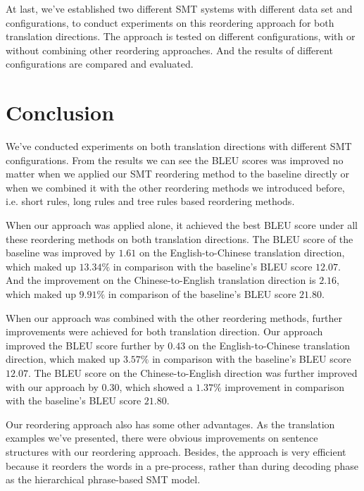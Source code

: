 At last, we've established two different \ac{SMT} systems with different data set and configurations, to conduct experiments on this reordering approach for both translation directions. The approach is tested on different configurations, with or without combining other reordering approaches. And the results of different configurations are compared and evaluated.

\section{Conclusion}
\label{ch:Discussion:sec:Conclusion}

We've conducted experiments on both translation directions with different \ac{SMT} configurations. From the results we can see the \ac{BLEU} scores was improved no matter when we applied our \ac{SMT} reordering method to the baseline directly or when we combined it with the other reordering methods we introduced before, i.e. short rules, long rules and tree rules based reordering methods.

When our approach was applied alone, it achieved the best \ac{BLEU} score under all these reordering methods on both translation directions. The \ac{BLEU} score of the baseline was improved by $1.61$ on the English-to-Chinese translation direction, which maked up $13.34\%$ in comparison with the baseline's \ac{BLEU} score $12.07$. And the improvement on the Chinese-to-English translation direction is $2.16$, which maked up $9.91\%$ in comparison of the baseline's \ac{BLEU} score $21.80$.

When our approach was combined with the other reordering methods, further improvements were achieved for both translation direction. Our approach improved the \ac{BLEU} score further by $0.43$ on the English-to-Chinese translation direction, which maked up $3.57\%$ in comparison with the baseline's \ac{BLEU} score $12.07$. The \ac{BLEU} score on the Chinese-to-English direction was further improved with our approach by $0.30$, which showed a $1.37\%$ improvement in comparison with the baseline's \ac{BLEU} score $21.80$.

Our reordering approach also has some other advantages. As the translation examples we've presented, there were obvious improvements on sentence structures with our reordering approach. Besides, the approach is very efficient because it reorders the words in a pre-process, rather than during decoding phase as the hierarchical phrase-based SMT model. 

